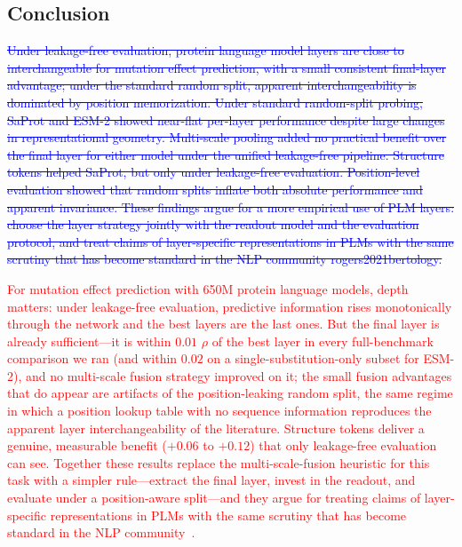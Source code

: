 \documentclass[11pt,a4paper]{article}
\newcommand{\rev}[1]{\textcolor{red}{#1}}
\begin{document}
\subsection{Conclusion}

\textcolor{blue}{\sout{Under leakage-free evaluation, protein language model layers are close to
interchangeable for mutation effect prediction, with a small consistent final-layer
advantage; under the standard random split, apparent interchangeability is dominated
by position memorization. Under standard random-split probing,
SaProt and ESM-2 showed near-flat per-layer performance despite large changes in
representational geometry. Multi-scale pooling added no practical benefit
over the final layer for either model under the unified leakage-free pipeline.
Structure tokens helped SaProt, but only under leakage-free evaluation.
Position-level evaluation showed that random splits inflate both absolute
performance and apparent invariance. These findings argue for a more empirical use
of PLM layers: choose the layer strategy jointly with the readout model and the
evaluation protocol, and treat claims of layer-specific representations in PLMs with
the same scrutiny that has become standard in the NLP community rogers2021bertology.}}

\textcolor{red}{\rev{For mutation effect prediction with 650M protein language models, depth
matters: under leakage-free evaluation, predictive information rises
monotonically through the network and the best layers are the last ones. But
the final layer is already sufficient---it is within $0.01$ $\rho$ of the best
layer in every full-benchmark comparison we ran (and within $0.02$ on a
single-substitution-only subset for ESM-2), and no multi-scale fusion
strategy improved
on it; the small fusion advantages that do appear are artifacts of the
position-leaking random split, the same regime in which a position lookup
table with no sequence information reproduces the apparent layer
interchangeability of the literature. Structure tokens deliver a genuine,
measurable benefit ($+0.06$ to $+0.12$) that only leakage-free evaluation can
see. Together these results replace the multi-scale-fusion heuristic for this
task with a simpler rule---extract the final layer, invest in the readout, and
evaluate under a position-aware split---and they argue for treating claims of
layer-specific representations in PLMs with
the same scrutiny that has become standard in the NLP
community~\cite{rogers2021bertology}.}}

\end{document}
